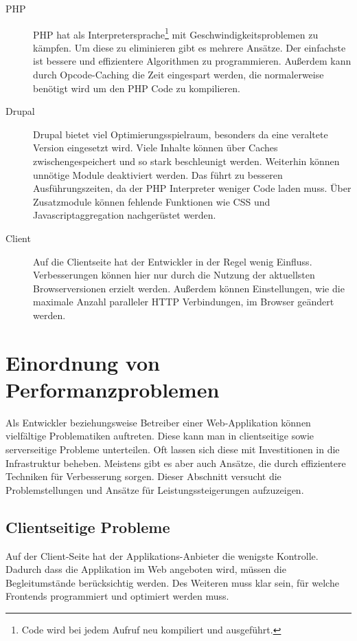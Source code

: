 \begin{description}
  \item[PHP] PHP hat als Interpretersprache\footnote{Code wird bei jedem Aufruf neu kompiliert und ausgef\"uhrt.} mit Geschwindigkeitsproblemen zu k\"ampfen. Um diese zu eliminieren gibt es mehrere Ans\"atze. Der einfachste ist bessere und effizientere Algorithmen zu programmieren. Au\ss{}erdem kann durch Opcode-Caching die Zeit eingespart werden, die normalerweise ben\"otigt wird um den PHP Code zu kompilieren. 
  \item[Drupal] Drupal bietet viel Optimierungsspielraum, besonders da eine veraltete Version eingesetzt wird. Viele Inhalte k\"onnen \"uber Caches zwischengespeichert und so stark beschleunigt werden. Weiterhin k\"onnen unn\"otige Module deaktiviert werden. Das f\"uhrt zu besseren Ausf\"uhrungszeiten, da der PHP Interpreter weniger Code laden muss. \"Uber Zusatzmodule k\"onnen fehlende Funktionen wie CSS und Javascriptaggregation nachger\"ustet werden.
  \item[Client] Auf die Clientseite hat der Entwickler in der Regel wenig Einfluss. Verbesserungen k\"onnen hier nur durch die Nutzung der aktuellsten Browserversionen erzielt werden. Au\ss{}erdem k\"onnen Einstellungen, wie die maximale Anzahl paralleler HTTP Verbindungen, im Browser ge\"andert werden.
\end{description}

\section{Einordnung von Performanzproblemen}
Als Entwickler beziehungsweise Betreiber einer Web-Applikation k\"onnen vielf\"altige Problematiken auftreten. Diese kann man in clientseitige sowie serverseitige Probleme unterteilen. Oft lassen sich diese mit Investitionen in die Infrastruktur beheben. Meistens gibt es aber auch Ans\"atze, die durch effizientere Techniken f\"ur Verbesserung sorgen. Dieser Abschnitt versucht die Problemstellungen und Ans\"atze f\"ur Leistungssteigerungen aufzuzeigen.
\subsection{Clientseitige Probleme}
Auf der Client-Seite hat der Applikations-Anbieter die wenigste Kontrolle. Dadurch dass die Applikation im Web angeboten wird, m\"ussen die Begleitumst\"ande ber\"ucksichtig werden. Des Weiteren muss klar sein, f\"ur welche Frontends programmiert und optimiert werden muss.  

